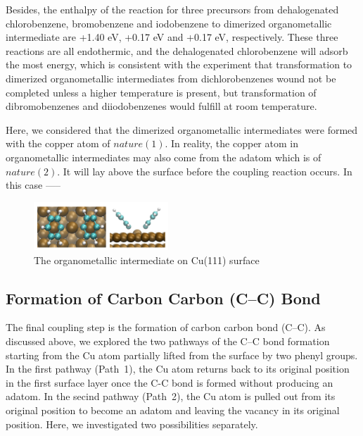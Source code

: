 \documentclass[%
 reprint,
 amsmath,amssymb,
 aps,
prb,
]{revtex4-2}
\begin{document}
Besides, the enthalpy of the reaction for three precursors from dehalogenated chlorobenzene, bromobenzene and iodobenzene to dimerized organometallic intermediate are +1.40 eV, +0.17 eV and +0.17 eV, respectively. These three reactions are all endothermic, and the dehalogenated chlorobenzene will adsorb the most energy, which is consistent with the experiment that transformation to dimerized organometallic intermediates from dichlorobenzenes wound not be completed unless a higher temperature is present, but transformation of dibromobenzenes and diiodobenzenes would fulfill at room temperature.

Here, we considered that the dimerized organometallic intermediates were formed with the copper atom of $nature(1)$. In reality, the copper atom in organometallic intermediates may also come from the adatom which is of $nature(2)$. It will lay above the surface before the coupling reaction occurs. In this case -----

\begin{figure}[hbt]
\centering
\includegraphics[width=0.45\textwidth]{Fig/organometallicintermediate.png}
\caption{The organometallic intermediate on Cu(111) surface}
\label{fig:organometallicintermediate}
\end{figure}

\subsection{Formation of Carbon Carbon (C--C) Bond}

The final coupling step is the formation of carbon carbon bond (C--C). As discussed above, we explored the two pathways of the C--C bond formation starting from  the Cu atom partially lifted from the surface by two phenyl groups. In the first pathway (Path~1), the Cu atom returns back to its original position in the first surface layer once the C-C bond is formed without producing an adatom. In the secind pathway (Path~2), the Cu atom is pulled out from its original position to become an adatom and leaving the vacancy in its original position. %
Here, we investigated two possibilities separately.
\end{document}
